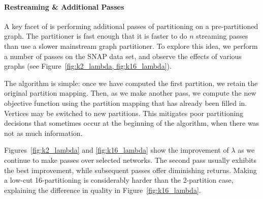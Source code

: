 
\paragraph{Restreaming \& Additional Passes}
A key facet of \ourmethod is performing additional passes of partitioning on a pre-partitioned graph. 
The partitioner is fast enough that it is faster to do $n$ streaming passes than use a slower mainstream graph partitioner.
To explore this idea, we perform a number of passes on the SNAP data set, and observe the effects of various graphs (see Figure~\ref{fig:k2_lambda, fig:k16_lambda}). 

The algorithm is simple: once we have computed the first partition, we retain the original partition mapping. 
Then, as we make another pass, we compute the new objective function using the partition mapping that has already been filled in. 
Vertices may be switched to new partitions. 
This mitigates poor partitioning decisions that sometimes occur at the beginning of the algorithm, when there was not as much information.

Figures~\ref{fig:k2_lambda} and \ref{fig:k16_lambda} show the improvement of $\lambda$ as we continue to make passes over selected networks. 
The second pass usually exhibits the best improvement, while subsequent passes offer diminishing returns.
Making a low-cut 16-partitioning is considerably harder than the 2-partition case, explaining the difference in quality in Figure~\ref{fig:k16_lambda}.





